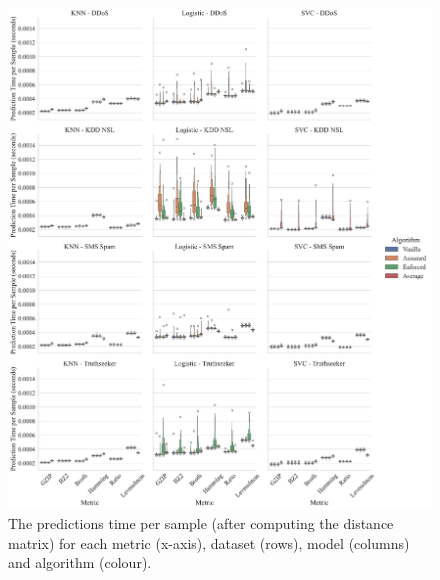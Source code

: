 \documentclass[preprint,12pt]{elsarticle}
\begin{document}
\begin{figure}
    \includegraphics[width=\textwidth]{images/pred_time_vs_algorithm.pdf}
    \caption{The predictions time per sample (after computing the distance matrix) for each metric (x-axis), dataset (rows), model (columns) and algorithm (colour).}
    \label{fig:pred_time}
\end{figure}
\end{document}
